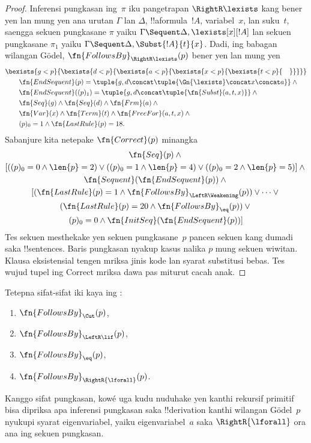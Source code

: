 \documentclass[../../../include/open-logic-section]{subfiles}
\begin{document}
\begin{proof}
Inferensi pungkasan ing~$\pi$ iku pangetrapan $\RightR\lexists$
kang bener yen lan mung yen ana urutan $\Gamma$ lan $\Delta$,
!!a{formula}~$!A$, variabel~$x$, lan suku~$t$, saengga sekuen
pungkasane $\pi$ yaiku $\Gamma \Sequent \Delta, \lexists[x][!A]$
lan sekuen pungkasane $\pi_1$ yaiku $\Gamma \Sequent \Delta,
\Subst{!A}{t}{x}$. Dadi, ing babagan wilangan G\"odel,
$\fn{FollowsBy}_{\RightR\lexists}(p)$ bener yen lan mung yen
\begin{align*}
  & \bexists{g<p}{\bexists{d<p}{\bexists{a<p}{\bexists{x<p}{\bexists{t<p}{\quad}}}}}\\
  & \qquad \fn{EndSequent}(p) = 
  \tuple{
    g,
    d \concat \tuple{\Gn{\lexists} \concat x \concat a}
  } \land {}\\
  & \qquad \fn{EndSequent}((p)_1) = 
  \tuple{
    g,
    d \concat \tuple{\fn{Subst}(a, t, x)}
  } \land {}\\
  & \qquad \fn{Seq}(g) \land \fn{Seq}(d) \land \fn{Frm}(a) \land {}\\
  & \qquad \fn{Var}(x) \land \fn{Term}(t) \land \fn{FreeFor}(a,t,x) \land {}\\
  & \qquad (p)_0 = 1 \land \fn{LastRule}(p) = 18.
\end{align*}
Sabanjure kita netepake $\fn{Correct}(p)$ minangka
\begin{multline*}
  \fn{Seq}(p) \land {}\\
  [((p)_0=0 \land \len{p}=2) \lor ((p)_0=1 \land \len{p}=4)
  \lor ((p)_0=2 \land \len{p}=5)] \land {}\\
  \fn{Sequent}(\fn{EndSequent}(p)) \land {}\\ 
  [(\fn{LastRule}(p) = 1 \land 
  \fn{FollowsBy}_{\LeftR\Weakening}(p)) \lor \dots \lor {}\\
  (\fn{LastRule}(p) = 20 \land \fn{FollowsBy}_{\eq}(p)) \lor {}\\
  (p)_0 = 0 \land \fn{InitSeq}(\fn{EndSequent}(p))]
\end{multline*}
Tes sekuen mesthekake yen sekuen pungkasane~$p$ pancen
sekuen kang dumadi saka !!{sentence}s. Baris pungkasan nyakup
kasus nalika $p$ mung sekuen wiwitan.
Klausa eksistensial tengen mriksa jinis kode lan syarat substitusi bebas. Tes wujud tupel ing Correct mriksa dawa pas miturut cacah anak.
\end{proof}

\begin{prob}
  Tetepna sifat-sifat iki kaya ing
  :
  \begin{enumerate}
  \item $\fn{FollowsBy}_{\Cut}(p)$,
  \item $\fn{FollowsBy}_{\LeftR\lif}(p)$,
  \item $\fn{FollowsBy}_{\eq}(p)$,
  \item $\fn{FollowsBy}_{\RightR{\lforall}}(p)$.
  \end{enumerate}
  Kanggo sifat pungkasan, kowé uga kudu nuduhake yen kanthi
  rekursif primitif bisa dipriksa apa inferensi pungkasan saka
  !!{derivation} kanthi wilangan G\"odel~$p$ nyukupi syarat
  eigenvariabel, yaiku eigenvariabel~$a$ saka $\RightR{\lforall}$
  ora ana ing sekuen pungkasan.
  \end{prob}
  
\end{document}
